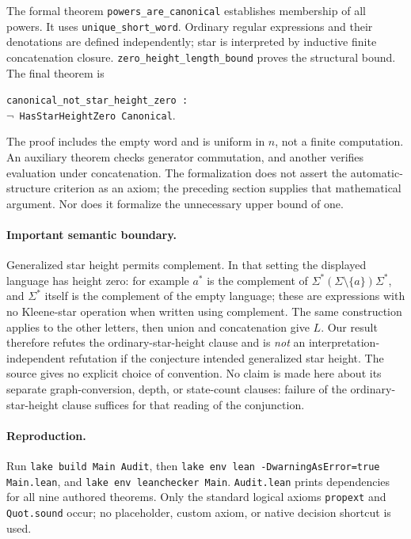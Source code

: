 \documentclass[11pt]{article}
\begin{document}
The formal theorem \texttt{powers\_are\_canonical} establishes membership of all powers. It uses \texttt{unique\_short\_word}. Ordinary regular expressions and their denotations are defined independently; star is interpreted by inductive finite concatenation closure. \texttt{zero\_height\_length\_bound} proves the structural bound. The final theorem is
\begin{center}
\texttt{canonical\_not\_star\_height\_zero :}\\
$\neg$\texttt{ HasStarHeightZero Canonical}.
\end{center}
The proof includes the empty word and is uniform in $n$, not a finite computation. An auxiliary theorem checks generator commutation, and another verifies evaluation under concatenation. The formalization does not assert the automatic-structure criterion as an axiom; the preceding section supplies that mathematical argument. Nor does it formalize the unnecessary upper bound of one.

\paragraph{Important semantic boundary.}
Generalized star height permits complement. In that setting the displayed language has height zero: for example $a^*$ is the complement of $\Sigma^*(\Sigma\setminus\{a\})\Sigma^*$, and $\Sigma^*$ itself is the complement of the empty language; these are expressions with no Kleene-star operation when written using complement. The same construction applies to the other letters, then union and concatenation give $L$. Our result therefore refutes the ordinary-star-height clause and is \emph{not} an interpretation-independent refutation if the conjecture intended generalized star height. The source gives no explicit choice of convention. No claim is made here about its separate graph-conversion, depth, or state-count clauses: failure of the ordinary-star-height clause suffices for that reading of the conjunction.

\paragraph{Reproduction.}
Run \texttt{lake build Main Audit}, then \texttt{lake env lean -DwarningAsError=true Main.lean}, and \texttt{lake env leanchecker Main}. \texttt{Audit.lean} prints dependencies for all nine authored theorems. Only the standard logical axioms \texttt{propext} and \texttt{Quot.sound} occur; no placeholder, custom axiom, or native decision shortcut is used.
\end{document}
